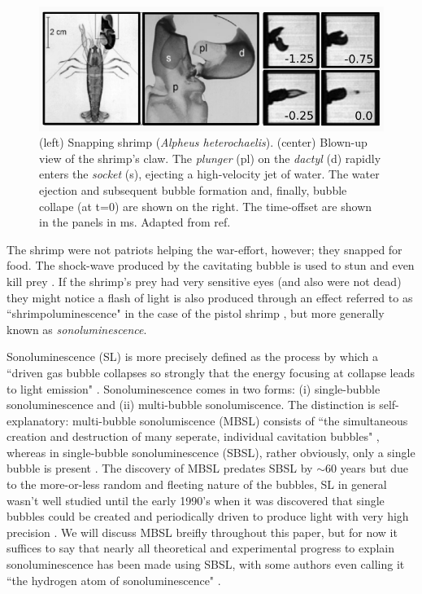 \documentclass[rmp,aps,nofootinbib,superscriptaddress,floatfix,10pt]{revtex4-2}
\begin{document}
\begin{figure}
\includegraphics[width=0.9\linewidth]{figs/shrimp_claw.pdf}
    \caption{(left) Snapping shrimp (\emph{Alpheus heterochaelis}). (center) Blown-up view of the shrimp's claw. The \emph{plunger} (pl) on the \emph{dactyl} (d) rapidly enters the \emph{socket} (s), ejecting a high-velocity jet of water. The water ejection and subsequent bubble formation and, finally, bubble collape (at t=0) are shown on the right. The time-offset are shown in the panels in ms. Adapted from ref. \cite{versluis2000snapping}}
\label{fig:shrimp_claw}
\end{figure}

The shrimp were not patriots helping the war-effort, however; they snapped for food. The shock-wave produced by the cavitating bubble is used to stun and even kill prey \cite{versluis2000snapping}. If the shrimp's prey had very sensitive eyes (and also were not dead) they might notice a flash of light is also produced through an effect referred to as ``shrimpoluminescence" in the case of the pistol shrimp \cite{lohse2001snapping}, but more generally known as \emph{sonoluminescence}.

Sonoluminescence (SL) is more precisely defined as the process by which a ``driven gas bubble collapses so strongly that the energy focusing at collapse leads to light emission" \cite{brenner2002single}. Sonoluminescence comes in two forms: (i) single-bubble sonoluminescence and (ii) multi-bubble sonolumiscence. The distinction is self-explanatory: multi-bubble sonolumiscence (MBSL) consists of  ``the simultaneous creation and destruction of many seperate, individual cavitation bubbles" \cite{crum1994sonoluminescence,brenner2002single}, whereas in single-bubble sonoluminescence (SBSL), rather obviously, only a single bubble is present \cite{gaitan1992sonoluminescence}. The discovery of MBSL predates SBSL by $\sim$60 years but due to the more-or-less random and fleeting nature of the bubbles, SL in general wasn't well studied until the early 1990's when it was discovered that single bubbles could be created and periodically driven to produce light with very high precision \cite{crum1994sonoluminescence,gaitan1990experimental,gaitan1992sonoluminescence,brenner2002single}. We will discuss MBSL breifly throughout this paper, but for now it suffices to say that nearly all theoretical and experimental progress to explain sonoluminescence has been made using SBSL, with some authors even calling it ``the hydrogen atom of sonoluminescence" \cite{lohse2018bubble,crum1994sonoluminescence}.
\end{document}
